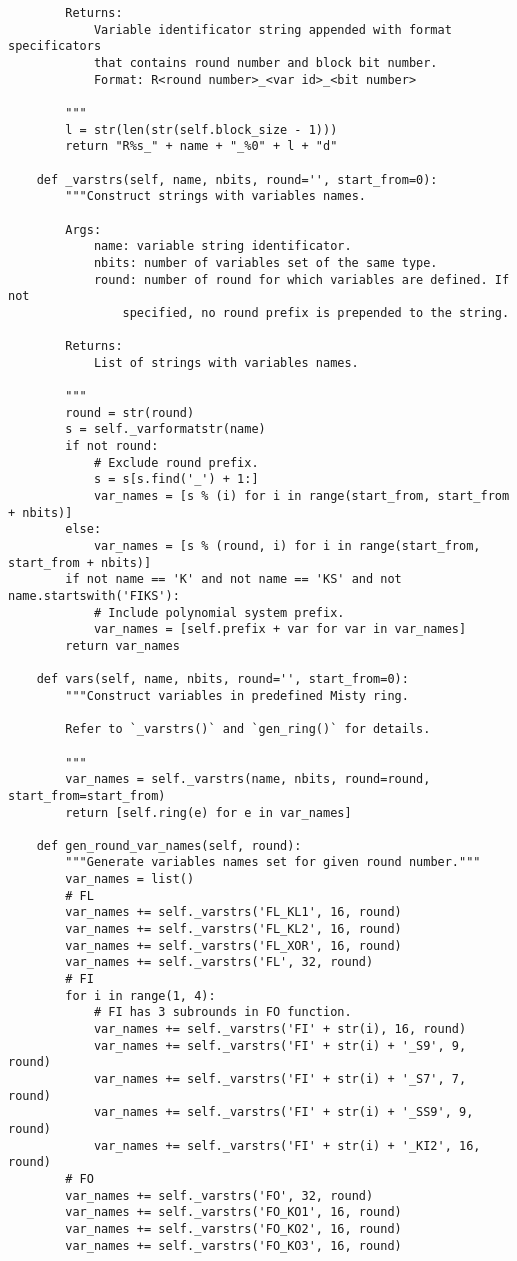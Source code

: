 \begin{lstlisting}
        Returns:
            Variable identificator string appended with format specificators
            that contains round number and block bit number.
            Format: R<round number>_<var id>_<bit number>

        """
        l = str(len(str(self.block_size - 1)))
        return "R%s_" + name + "_%0" + l + "d"

    def _varstrs(self, name, nbits, round='', start_from=0):
        """Construct strings with variables names.

        Args:
            name: variable string identificator.
            nbits: number of variables set of the same type.
            round: number of round for which variables are defined. If not
                specified, no round prefix is prepended to the string.

        Returns:
            List of strings with variables names.

        """
        round = str(round)
        s = self._varformatstr(name)
        if not round:
            # Exclude round prefix.
            s = s[s.find('_') + 1:]
            var_names = [s % (i) for i in range(start_from, start_from + nbits)]
        else:
            var_names = [s % (round, i) for i in range(start_from, start_from + nbits)]
        if not name == 'K' and not name == 'KS' and not name.startswith('FIKS'):
            # Include polynomial system prefix.
            var_names = [self.prefix + var for var in var_names]
        return var_names

    def vars(self, name, nbits, round='', start_from=0):
        """Construct variables in predefined Misty ring.

        Refer to `_varstrs()` and `gen_ring()` for details.

        """
        var_names = self._varstrs(name, nbits, round=round, start_from=start_from)
        return [self.ring(e) for e in var_names]

    def gen_round_var_names(self, round):
        """Generate variables names set for given round number."""
        var_names = list()
        # FL
        var_names += self._varstrs('FL_KL1', 16, round)
        var_names += self._varstrs('FL_KL2', 16, round)
        var_names += self._varstrs('FL_XOR', 16, round)
        var_names += self._varstrs('FL', 32, round)
        # FI
        for i in range(1, 4):
            # FI has 3 subrounds in FO function.
            var_names += self._varstrs('FI' + str(i), 16, round)
            var_names += self._varstrs('FI' + str(i) + '_S9', 9, round)
            var_names += self._varstrs('FI' + str(i) + '_S7', 7, round)
            var_names += self._varstrs('FI' + str(i) + '_SS9', 9, round)
            var_names += self._varstrs('FI' + str(i) + '_KI2', 16, round)
        # FO
        var_names += self._varstrs('FO', 32, round)
        var_names += self._varstrs('FO_KO1', 16, round)
        var_names += self._varstrs('FO_KO2', 16, round)
        var_names += self._varstrs('FO_KO3', 16, round)



\end{lstlisting}
